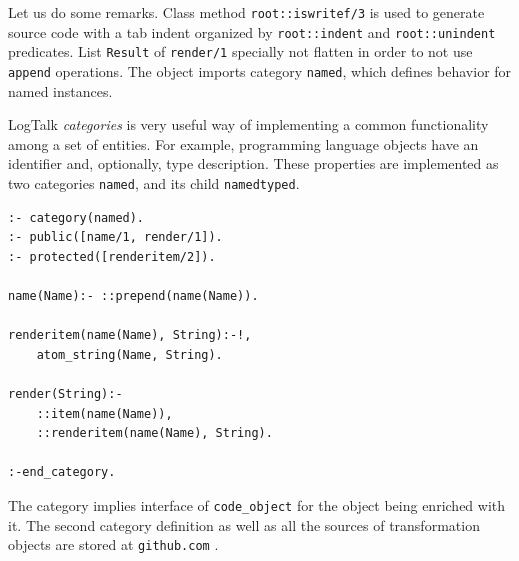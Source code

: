 \documentclass[conference]{IEEEtran}
\begin{document}
Let us do some remarks.  Class method \verb|root::iswritef/3| is used to generate source code with a tab indent organized by \verb|root::indent| and \verb|root::unindent| predicates.  List \verb|Result| of \verb|render/1| specially not flatten in order to not use \verb|append| operations.  The object imports category \verb|named|, which defines behavior for named instances.


LogTalk \emph{categories} is very useful way of implementing a common functionality among a set of entities.  For example, programming language objects have an identifier and, optionally, type description.  These properties are implemented as two categories
\texttt{named}, and its child \texttt{namedtyped}.
\begin{verbatim}
:- category(named).
:- public([name/1, render/1]).
:- protected([renderitem/2]).

name(Name):- ::prepend(name(Name)).

renderitem(name(Name), String):-!,
    atom_string(Name, String).

render(String):-
    ::item(name(Name)),
    ::renderitem(name(Name), String).

:-end_category.
\end{verbatim}

The category implies interface of \texttt{code\_object} for the object being enriched with it.  The second category definition as well as all the sources of transformation objects are stored at \texttt{github.com} \cite{ghsrc}.  %




\end{document}
